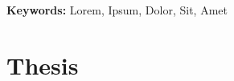 \documentclass[electronic]{kthesis}
\begin{document}
\sloppy


\emergencystretch=10pt
\maketitle

\frontmatter %
\begin{abstract}
\noindent %

\end{abstract}

\bigskip \bigskip \bigskip \bigskip \bigskip

\setlength{\leftskip}{0.3 cm} \textbf {Keywords:} Lorem, Ipsum, Dolor, Sit, Amet

\newpage
{}
\begin{abstract}
\noindent %
\end{abstract}



%

\mainmatter %
\tableofcontents
\part{Thesis}
\clearpage








%
\renewcommand{\bibname}{References}%


\printindex
\end{document}
